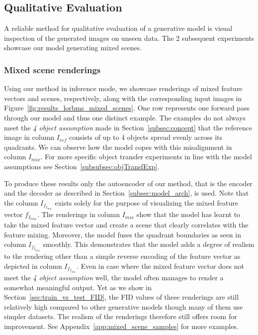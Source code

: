 \documentclass[12pt,a4paper]{article}
\begin{document}

\subsection{Qualitative Evaluation}\label{subsec:qual_eval}
A reliable method for qualitative evaluation of a generative model is visual inspection of the generated images on unseen data. The 2 subsequent experiments showcase our model generating mixed scenes.

\subsubsection{Mixed scene renderings}\label{sec:scene_renderings}
Using our method in inference mode, we showcase renderings of mixed feature vectors and scenes, respectively, along with the corresponding input images in Figure~\ref{fig:results_lorbms_mixed_scenes}. One row represents one forward pass through our model and thus one distinct example. The examples do not always meet the \textit{4 object assumption} made in Section~\ref{subsec:concept} that the reference image in column $I_{ref}$ consists of up to 4 objects spread evenly across its quadrants. We can observe how the model copes with this misalignment in column $I_{mix}$. For more specific object transfer experiments in line with the model assumptions see Section~\ref{subsubsec:objTransfExp}. 

To produce these results only the autoencoder of our method, that is the encoder and the decoder as described in Section~\ref{subsec:model_arch}, is used. Note that the column $I_{f_{I_{mix}}}$ exists solely for the purpose of visualizing the mixed feature vector $f_{I_{mix}}$. The renderings in column $I_{mix}$ show that the model has learnt to take the mixed feature vector and create a scene that clearly correlates with the feature mixing. Moreover, the model fuses the quadrant boundaries as seen in column $I_{f_{I_{mix}}}$ smoothly. This demonstrates that the model adds a degree of realism to the rendering other than a simple reverse encoding of the feature vector as depicted in column $I_{f_{I_{mix}}}$. Even in case where the mixed feature vector does not meet the \textit{4 object assumption} well, the model often manages to render a somewhat meaningful output. Yet as we show in Section~\ref{sec:train_vs_test_FID}, the FID values of these renderings are still relatively high compared to other generative models though many of them use simpler datasets. The realism of the renderings therefore still offers room for improvement.
See Appendix~\ref{app:mixed_scene_samples} for more examples.
\end{document}
